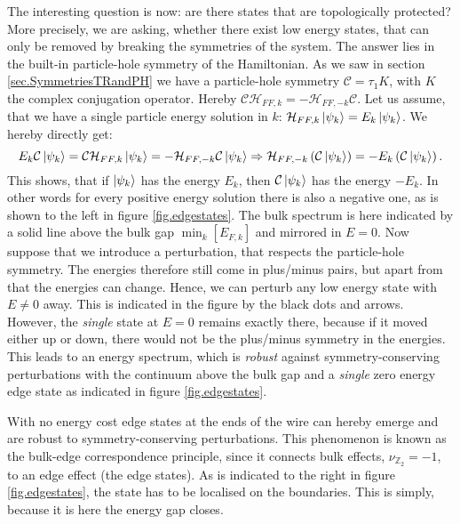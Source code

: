 The interesting question is now: are there states that are topologically protected? More precisely, we are asking, whether there exist low energy states, that can only be removed by breaking the symmetries of the system. The answer lies in the built-in particle-hole symmetry of the Hamiltonian. As we saw in section \ref{sec.SymmetriesTRandPH} we have a particle-hole symmetry $\mathcal{C} = \tau_1 K$, with $K$ the complex conjugation operator. Hereby $\mathcal{C}\mathcal{H}_{FF,k} = -\mathcal{H}_{FF,-k}\mathcal{C}$. Let us assume, that we have a single particle energy solution in $k$: $\mathcal{H}_{FF,k}\ket{\psi_k} = E_k\ket{\psi_k}$. We hereby directly get:
\begin{equation}
E_k\mathcal{C}\ket{\psi_k} = \mathcal{C}\mathcal{H}_{FF,k}\ket{\psi_k} = -\mathcal{H}_{FF,-k}\mathcal{C}\ket{\psi_k} \Rightarrow \mathcal{H}_{FF,-k}\left(\mathcal{C}\ket{\psi_k}\right) = -E_k\left(\mathcal{C}\ket{\psi_k}\right).
\end{equation}
This shows, that if $\ket{\psi_k}$ has the energy $E_k$, then $\mathcal{C}\ket{\psi_k}$ has the energy $-E_k$. In other words for every positive energy solution there is also a negative one, as is shown to the left in figure \ref{fig.edgestates}. The bulk spectrum is here indicated by a solid line above the bulk gap $\min_k[E_{F,k}]$ and mirrored in $E = 0$. Now suppose that we introduce a perturbation, that respects the particle-hole symmetry. The energies therefore still come in plus/minus pairs, but apart from that the energies can change. Hence, we can perturb any low energy state with $E \neq 0 $ away. This is indicated in the figure by the black dots and arrows. However, the \textit{single} state at $E = 0$ remains exactly there, because if it moved either up or down, there would not be the plus/minus symmetry in the energies. This leads to an energy spectrum, which is \textit{robust} against symmetry-conserving perturbations with the continuum above the bulk gap and a \textit{single} zero energy edge state as indicated in figure \ref{fig.edgestates}. 

With no energy cost edge states at the ends of the wire can hereby emerge and are robust to symmetry-conserving perturbations. This phenomenon is known as the bulk-edge correspondence principle, since it connects bulk effects, $\nu_{\mathbb{Z}_2} = - 1$, to an edge effect (the edge states). As is indicated to the right in figure \ref{fig.edgestates}, the state has to be localised on the boundaries. This is simply, because it is here the energy gap closes. 

